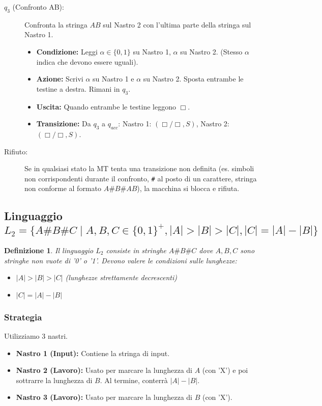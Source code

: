 \documentclass[a4paper, 11pt]{book} %
\newtheorem{definition}[theorem]{Definizione}
\theoremstyle{definition}
\begin{document}
\begin{description}
\begin{itemize}
    \end{itemize}
    \item[$q_3$ (Confronto AB):] Confronta la stringa $AB$ sul Nastro 2 con l'ultima parte della stringa sul Nastro 1.
    \begin{itemize}
        \item \textbf{Condizione:} Leggi $\alpha \in \{0,1\}$ su Nastro 1, $\alpha$ su Nastro 2. (Stesso $\alpha$ indica che devono essere uguali).
        \item \textbf{Azione:} Scrivi $\alpha$ su Nastro 1 e $\alpha$ su Nastro 2. Sposta entrambe le testine a destra. Rimani in $q_3$.
        \item \textbf{Uscita:} Quando entrambe le testine leggono $\Box$.
        \item \textbf{Transizione:} Da $q_3$ a $q_{acc}$: Nastro 1: $(\Box/\Box, S)$, Nastro 2: $(\Box/\Box, S)$.
    \end{itemize}
    \item[Rifiuto:] Se in qualsiasi stato la MT tenta una transizione non definita (es. simboli non corrispondenti durante il confronto, \texttt{\#} al posto di un carattere, stringa non conforme al formato $A\texttt{\#}B\texttt{\#}AB$), la macchina si blocca e rifiuta.
\end{description}

\subsection{Linguaggio $L_2 = \{A\#B\#C \mid A,B,C \in \{0,1\}^+, |A|>|B|>|C|, |C|=|A|-|B|\}$}
\begin{definition}
Il linguaggio $L_2$ consiste in stringhe $A\#B\#C$ dove $A,B,C$ sono stringhe non vuote di '0' o '1'. Devono valere le condizioni sulle lunghezze:
\begin{itemize}
    \item $|A| > |B| > |C|$ (lunghezze strettamente decrescenti)
    \item $|C| = |A| - |B|$
\end{itemize}
\end{definition}

\subsubsection{Strategia}
Utilizziamo 3 nastri.
\begin{itemize}
    \item \textbf{Nastro 1 (Input):} Contiene la stringa di input.
    \item \textbf{Nastro 2 (Lavoro):} Usato per marcare la lunghezza di $A$ (con 'X') e poi sottrarre la lunghezza di $B$. Al termine, conterrà $|A|-|B|$.
    \item \textbf{Nastro 3 (Lavoro):} Usato per marcare la lunghezza di $B$ (con 'X').
\end{itemize}
\end{document}

